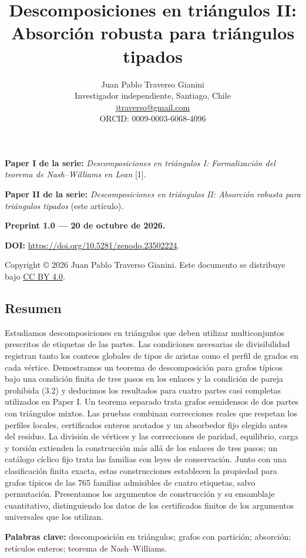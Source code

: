\documentclass[spanish,11pt,a4paper]{article}
\title{Descomposiciones en triángulos II: Absorción robusta para triángulos tipados}
\author{Juan Pablo Traverso Gianini\\
\small Investigador independiente, Santiago, Chile\\
\small \href{mailto:jtraverso@gmail.com}{jtraverso@gmail.com}\\
\small ORCID: 0009-0003-6068-4096}
\date{}
\begin{document}
\raggedbottom
\maketitle
\textbf{Paper I de la serie:} \emph{Descomposiciones en triángulos I: Formalización del teorema de Nash--Williams en Lean} {[}1{]}.

\textbf{Paper II de la serie:} \emph{Descomposiciones en triángulos II: Absorción robusta para triángulos tipados} (este artículo).

\textbf{Preprint 1.0 --- 20 de octubre de 2026.}

\textbf{DOI:} \url{https://doi.org/10.5281/zenodo.23502224}.

Copyright © 2026 Juan Pablo Traverso Gianini. Este documento se distribuye bajo \href{https://creativecommons.org/licenses/by/4.0/}{CC BY 4.0}.

\subsection{Resumen}\label{resumen}

Estudiamos descomposiciones en triángulos que deben utilizar multiconjuntos prescritos de etiquetas de las partes. Las condiciones necesarias de divisibilidad registran tanto los conteos globales de tipos de aristas como el perfil de grados en cada vértice. Demostramos un teorema de descomposición para grafos típicos bajo una condición finita de tres pasos en los enlaces y la condición de pareja prohibida (3.2) y deducimos los resultados para cuatro partes casi completas utilizados en Paper I. Un teorema separado trata grafos semidensos de dos partes con triángulos mixtos. Las pruebas combinan correcciones reales que respetan los perfiles locales, certificados enteros acotados y un absorbedor fijo elegido antes del residuo. La división de vértices y las correcciones de paridad, equilibrio, carga y torsión extienden la construcción más allá de los enlaces de tres pasos; un catálogo cíclico fijo trata las familias con leyes de conservación. Junto con una clasificación finita exacta, estas construcciones establecen la propiedad para grafos típicos de las 765 familias admisibles de cuatro etiquetas, salvo permutación. Presentamos los argumentos de construcción y su ensamblaje cuantitativo, distinguiendo los datos de los certificados finitos de los argumentos universales que los utilizan.

\textbf{Palabras clave:} descomposición en triángulos; grafos con partición; absorción; retículos enteros; teorema de Nash--Williams.
\end{document}

